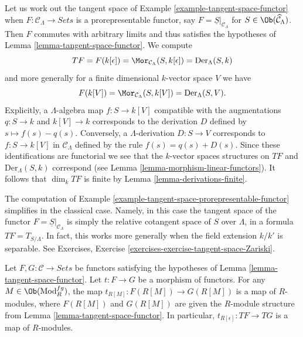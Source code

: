 \begin{example}
\label{example-tangent-space-prorepresentable-functor}
Let us work out the tangent space of
Example \ref{example-tangent-space-functor}
when $F : \mathcal{C}_\Lambda \to \textit{Sets}$ is a
prorepresentable functor, say $F = \underline{S}|_{\mathcal{C}_\Lambda}$
for $S \in \Ob(\widehat{\mathcal{C}}_\Lambda)$. Then $F$ commutes
with arbitrary limits and thus satisfies the hypotheses of
Lemma \ref{lemma-tangent-space-functor}.
We compute
$$
TF = F(k[\epsilon]) = \Mor_{\mathcal{C}_\Lambda}(S, k[\epsilon])
= \text{Der}_\Lambda(S, k)
$$
and more generally for a finite dimensional $k$-vector space $V$ we have
$$
F(k[V]) = \Mor_{\mathcal{C}_\Lambda}(S, k[V]) = \text{Der}_\Lambda(S, V).
$$
Explicitly, a $\Lambda$-algebra map $f : S \to k[V]$ compatible with
the augmentations $q : S \to k$ and $k[V] \to k$ corresponds to the derivation
$D$ defined by $s \mapsto f(s) - q(s)$. Conversely, a
$\Lambda$-derivation $D : S \to V$ corresponds to $f : S \to k[V]$
in $\mathcal{C}_\Lambda$ defined by the rule $f(s) = q(s) + D(s)$. Since
these identifications are functorial we see that the $k$-vector spaces
structures on $TF$ and $\text{Der}_\Lambda(S, k)$ correspond (see
Lemma \ref{lemma-morphism-linear-functors}).
It follows that $\dim_k TF$ is finite by
Lemma \ref{lemma-derivations-finite}.
\end{example}

\begin{example}
\label{example-tangent-space-classical-prorepresentable-functor}
The computation of
Example \ref{example-tangent-space-prorepresentable-functor}
simplifies in the classical case. Namely, in this case
the tangent space of the functor
$F = \underline{S}|_{\mathcal{C}_\Lambda}$ is simply the
relative cotangent space of $S$ over $\Lambda$, in a formula
$TF = T_{S/\Lambda}$. In fact, this works more generally when the
field extension $k/k'$ is separable. See
Exercises, Exercise \ref{exercises-exercise-tangent-space-Zariski}.
\end{example}

\begin{lemma}
\label{lemma-morphism-tangent-spaces}
Let $F, G: \mathcal{C} \to \textit{Sets}$ be functors satisfying
the hypotheses of
Lemma \ref{lemma-tangent-space-functor}.
Let $t : F \to G$ be a morphism of functors. For any
$M \in \Ob(\text{Mod}^{fg}_R)$, the map
$t_{R[M]}: F(R[M]) \to G(R[M])$ is a map of $R$-modules, where
$F(R[M])$ and $G(R[M])$ are given the $R$-module structure from
Lemma \ref{lemma-tangent-space-functor}.
In particular, $t_{R[\epsilon]} : TF \to TG$ is a map of $R$-modules.
\end{lemma}

